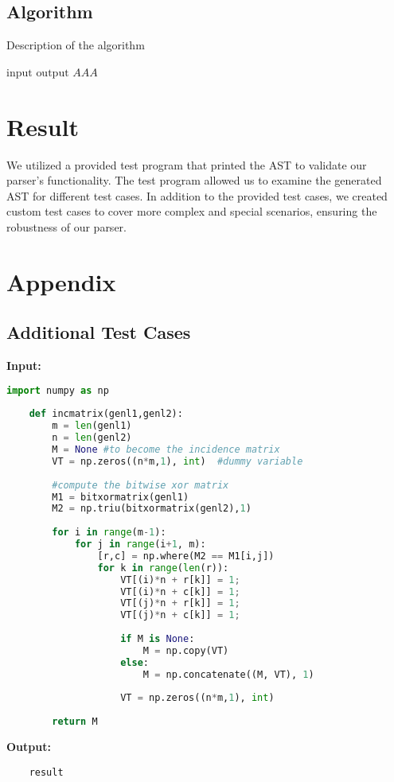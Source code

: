 \documentclass[12pt]{article}
\begin{document}
\subsection{Algorithm}
\begin{algorithm}[H]
    \begin{algorithmic}
        \STATE\caption{Description of the algorithm}
        \REQUIRE\(\text{input}\)
        \ENSURE \(\text{output}\)
        \STATE\(AAA\)\\
    \end{algorithmic}
\end{algorithm}

\section{Result}
We utilized a provided test program that printed the AST to validate our parser's functionality.
The test program allowed us to examine the generated AST for different test cases.
In addition to the provided test cases, we created custom test cases to cover more complex and special scenarios, ensuring the robustness of our parser.




\newpage

\appendix
{}
\section{Appendix}
\subsection{Additional Test Cases}
\textbf{Input:}
\begin{lstlisting}[language=Python, caption={[short]caption text}]
    import numpy as np
        
    def incmatrix(genl1,genl2):
        m = len(genl1)
        n = len(genl2)
        M = None #to become the incidence matrix
        VT = np.zeros((n*m,1), int)  #dummy variable
        
        #compute the bitwise xor matrix
        M1 = bitxormatrix(genl1)
        M2 = np.triu(bitxormatrix(genl2),1) 
    
        for i in range(m-1):
            for j in range(i+1, m):
                [r,c] = np.where(M2 == M1[i,j])
                for k in range(len(r)):
                    VT[(i)*n + r[k]] = 1;
                    VT[(i)*n + c[k]] = 1;
                    VT[(j)*n + r[k]] = 1;
                    VT[(j)*n + c[k]] = 1;
                    
                    if M is None:
                        M = np.copy(VT)
                    else:
                        M = np.concatenate((M, VT), 1)
                    
                    VT = np.zeros((n*m,1), int)
        
        return M
\end{lstlisting}

\textbf{Output:}
\begin{verbatim}
    result
\end{verbatim}
\end{document}
